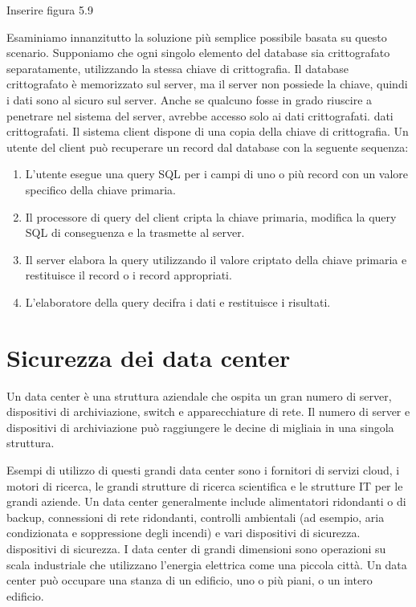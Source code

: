 Inserire figura 5.9 

Esaminiamo innanzitutto la soluzione più semplice possibile basata su questo scenario. Supponiamo che ogni singolo elemento del database sia crittografato separatamente, utilizzando la stessa chiave di crittografia.
Il database crittografato è memorizzato sul server, ma il server non possiede la chiave, quindi i dati sono al sicuro sul server. Anche se qualcuno fosse in grado riuscire a penetrare nel sistema del server, avrebbe accesso solo ai dati crittografati. dati crittografati. Il sistema client dispone di una copia della chiave di crittografia. Un utente del client può recuperare un record dal database con la seguente sequenza:

\begin{enumerate}
    \item L'utente esegue una query SQL per i campi di uno o più record con un valore specifico della chiave primaria.
    
    \item Il processore di query del client cripta la chiave primaria, modifica la query SQL di conseguenza e la trasmette al server.
    
    \item Il server elabora la query utilizzando il valore criptato della chiave primaria e restituisce il record o i record appropriati.
    
    \item L'elaboratore della query decifra i dati e restituisce i risultati.
\end{enumerate}
\newpage
\section{Sicurezza dei data center}
Un data center è una struttura aziendale che ospita un gran numero di server, dispositivi di archiviazione, switch e apparecchiature di rete. Il numero di server e dispositivi di archiviazione può raggiungere le decine di migliaia in una singola struttura. 

\singlespacing

Esempi di utilizzo di questi grandi data center sono i fornitori di servizi cloud, i motori di ricerca, le grandi strutture di ricerca scientifica e le strutture IT per le grandi aziende. Un data center generalmente include alimentatori ridondanti o di backup, connessioni di rete ridondanti, controlli ambientali (ad esempio, aria condizionata e soppressione degli incendi) e vari dispositivi di sicurezza. dispositivi di sicurezza. I data center di grandi dimensioni sono operazioni su scala industriale che utilizzano l'energia elettrica come una piccola città. Un data center può occupare una stanza di un edificio, uno o più piani, o un intero edificio.

